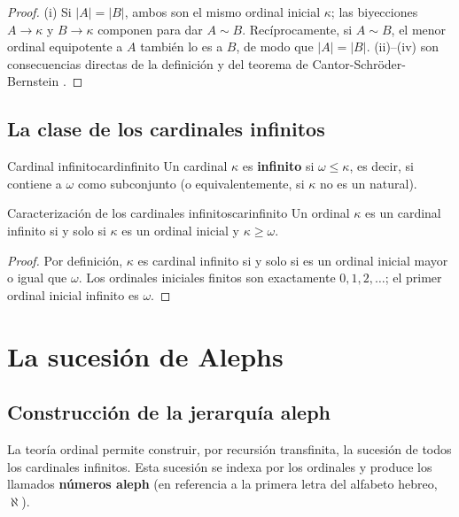 \begin{proof}
(i) Si $|A| = |B|$, ambos son el mismo ordinal inicial $\kappa$; las biyecciones $A \to \kappa$ y $B \to \kappa$ componen para dar $A \sim B$. Recíprocamente, si $A \sim B$, el menor ordinal equipotente a $A$ también lo es a $B$, de modo que $|A| = |B|$. (ii)--(iv) son consecuencias directas de la definición y del teorema de Cantor-Schröder-Bernstein \cite{enderton1977}.
\end{proof}

\subsection{La clase de los cardinales infinitos}

\begin{definicion}{Cardinal infinito}{cardinfinito}
Un cardinal $\kappa$ es \textbf{infinito} si $\omega \leq \kappa$, es decir, si contiene a $\omega$ como subconjunto (o equivalentemente, si $\kappa$ no es un natural).
\end{definicion}

\begin{teorema}{Caracterización de los cardinales infinitos}{carinfinito}
Un ordinal $\kappa$ es un cardinal infinito si y solo si $\kappa$ es un ordinal inicial y $\kappa \geq \omega$.
\end{teorema}

\begin{proof}
Por definición, $\kappa$ es cardinal infinito si y solo si es un ordinal inicial mayor o igual que $\omega$. Los ordinales iniciales finitos son exactamente $0, 1, 2, \ldots$; el primer ordinal inicial infinito es $\omega$.
\end{proof}

\section{La sucesión de Alephs}

\subsection{Construcción de la jerarquía aleph}

La teoría ordinal permite construir, por recursión transfinita, la sucesión de todos los cardinales infinitos. Esta sucesión se indexa por los ordinales y produce los llamados \textbf{números aleph} (en referencia a la primera letra del alfabeto hebreo, $\aleph$).

